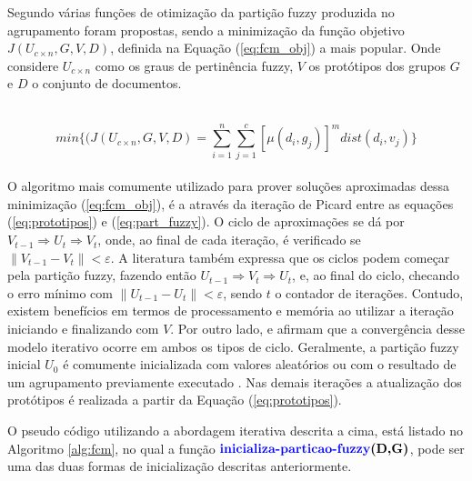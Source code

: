 Segundo  várias funções de otimização da partição fuzzy produzida no
agrupamento foram propostas, sendo a minimização da função objetivo $J(U_{c \times n},G,V,D)$, 
definida na Equação (\ref{eq:fcm_obj}) a mais popular. Onde considere $U_{c \times n}$ como os graus
de pertinência fuzzy, $V$ os protótipos dos grupos $G$ e $D$ o conjunto de documentos.  

\leavevmode\\
\begin{equation} min\{(J(U_{c \times
n},G,V,D) = \sum_{i=1}^n \sum_{j=1}^c [\mu(d_i, g_j)]^m dist(d_i, v_j)\} 
\label{eq:fcm_obj}
\end{equation} 
\leavevmode\\

O algoritmo mais comumente utilizado para prover soluções aproximadas dessa minimização
(\ref{eq:fcm_obj}), é a através da iteração de Picard\footnotemark \cite{Pal2005} entre as equações
(\ref{eq:prototipos}) e (\ref{eq:part_fuzzy}). 
O ciclo de aproximações se dá por $V_{t-1} \Rightarrow  U_t \Rightarrow  V_t$, onde, ao final de
cada iteração, é verificado se $\parallel V_{t-1} - V_t\parallel < \varepsilon$.  A literatura
também expressa que os ciclos podem começar pela partição fuzzy, fazendo então $U_{t-1} \Rightarrow
V_t \Rightarrow U_t$, e, ao final do ciclo, checando o erro mínimo com $\parallel U_{t-1} -
U_t\parallel < \varepsilon$, sendo $t$ o contador de iterações.  Contudo, existem benefícios em
termos de processamento e memória ao utilizar a iteração iniciando e finalizando com
$V$\cite{Pal2005}. Por outro lado,  e  afirmam que a
convergência desse modelo iterativo ocorre em ambos os tipos de ciclo. Geralmente, a partição fuzzy
inicial $U_0$ é comumente inicializada com valores aleatórios ou com o resultado de um agrupamento
previamente executado \cite{Pal2005,Krishnapuram1993}. Nas demais iterações a atualização dos
protótipos é realizada a partir da Equação (\ref{eq:prototipos}).  

O pseudo código utilizando a abordagem iterativa descrita a cima, está listado no Algoritmo
\ref{alg:fcm}, no qual a função $\textbf{{\color{blue}inicializa-particao-fuzzy}(D,G)}$, pode ser
uma das duas formas de inicialização descritas anteriormente.

